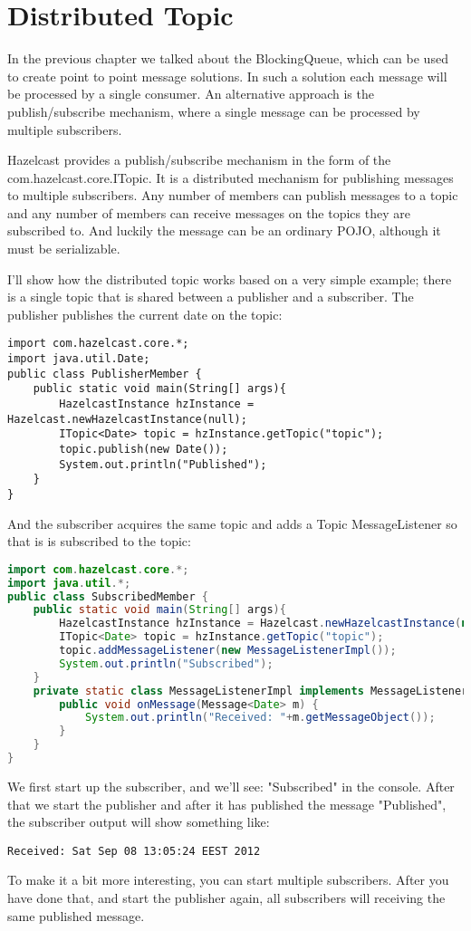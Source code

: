 \chapter{Distributed Topic}
In the previous chapter we talked about the BlockingQueue, which can be used to create point to point message solutions. In such a solution each message will be processed by a single consumer. An alternative approach is the publish/subscribe mechanism, where a single message can be processed by multiple subscribers.

Hazelcast provides a publish/subscribe mechanism in the form of the com.hazelcast.core.ITopic. It is a distributed mechanism for publishing messages to multiple subscribers. Any number of members can publish messages to a topic and any number of members can receive messages on the topics they are subscribed to. And luckily the message can be an ordinary POJO, although it must be serializable. 

I'll show how the distributed topic works based on a very simple example; there is a single topic that is shared between a publisher and a subscriber. The publisher publishes the current date on the topic:
\begin{verbatim}
import com.hazelcast.core.*;
import java.util.Date;
public class PublisherMember {
    public static void main(String[] args){
        HazelcastInstance hzInstance = Hazelcast.newHazelcastInstance(null);
        ITopic<Date> topic = hzInstance.getTopic("topic");
        topic.publish(new Date());
        System.out.println("Published");
    }
}
\end{verbatim}
And the subscriber acquires the same topic and adds a Topic MessageListener so that is is subscribed to the topic:
\begin{lstlisting}[language=java]
import com.hazelcast.core.*;
import java.util.*;
public class SubscribedMember {
    public static void main(String[] args){
        HazelcastInstance hzInstance = Hazelcast.newHazelcastInstance(null);
        ITopic<Date> topic = hzInstance.getTopic("topic");
        topic.addMessageListener(new MessageListenerImpl());
        System.out.println("Subscribed");
    }
    private static class MessageListenerImpl implements MessageListener<Date> {
        public void onMessage(Message<Date> m) {
            System.out.println("Received: "+m.getMessageObject());
        }
    }
}
\end{lstlisting}
We first start up the subscriber, and we'll see: "Subscribed" in the console. After that we start the publisher and after it has published the message "Published", the subscriber output will show something like:
\begin{verbatim}
Received: Sat Sep 08 13:05:24 EEST 2012
\end{verbatim}
To make it a bit more interesting, you can start multiple subscribers. After you have done that, and start the publisher again, all subscribers will receiving the same published message.

